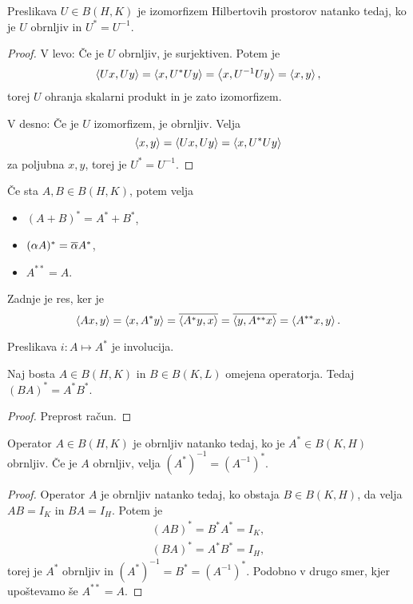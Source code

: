 \begin{trditev}
  Preslikava $U \in B(H,K)$ je izomorfizem Hilbertovih prostorov natanko tedaj,
  ko je $U$ obrnljiv in $U^* = U^{-1}$.
\end{trditev}

\begin{proof}
  V levo:
  Če je $U$ obrnljiv, je surjektiven.
  Potem je
  \[
	\left< Ux,Uy \right> = \left< x, U^*U y \right> = \left< x, U^{-1} U y \right> = \left< x,y \right>,
  \]
  torej $U$ ohranja skalarni produkt in je zato izomorfizem.

  V desno:
  Če je $U$ izomorfizem, je obrnljiv.
  Velja
  \[
	\left< x,y \right> = \left< Ux, Uy \right> = \left< x, U^* U y \right>
  \]
  za poljubna $x, y$, torej je $U^* = U^{-1}$.
\end{proof}

\begin{opomba}
  Če sta $A, B \in B(H,K)$, potem velja
  \begin{itemize}
  \item $(A + B)^* = A^* + B^*$,
  \item $(\alpha A)^* = \overline{\alpha} A^*$,
  \item $A^{**} = A$.
  \end{itemize}
  Zadnje je res, ker je
  \[
	\left< Ax,y \right> = \left< x, A^* y \right> = \overline{\left< A^* y, x \right>} = \overline{\left< y, A^{**} x \right>} =
	\left< A^{**}x, y \right>.
  \]
\end{opomba}

\begin{opomba}
  Preslikava $i: A \mapsto A^*$ je involucija.
\end{opomba}

\begin{trditev}
  Naj bosta $A \in B(H,K)$ in $B \in B(K,L)$ omejena operatorja.
  Tedaj $(BA)^* = A^* B^*$.
\end{trditev}

\begin{proof}
  Preprost račun.
\end{proof}

\begin{posledica}
  Operator $A \in B(H,K)$ je obrnljiv natanko tedaj, ko je $A^* \in B(K,H)$
  obrnljiv.
  Če je $A$ obrnljiv, velja $(A^*)^{-1} = (A^{-1})^*$.
\end{posledica}

\begin{proof}
  Operator $A$ je obrnljiv natanko tedaj, ko obstaja $B \in B(K,H)$, da velja
  $AB = I_K$ in $BA = I_H$.
  Potem je
  \begin{gather*}
	(AB)^* = B^* A^* = I_K, \\
	(BA)^* = A^* B^* = I_H,
  \end{gather*}
  torej je $A^*$ obrnljiv in $(A^*)^{-1} = B^* = (A^{-1})^*$.
  Podobno v drugo smer, kjer upoštevamo še $A^{**} = A$.
\end{proof}

